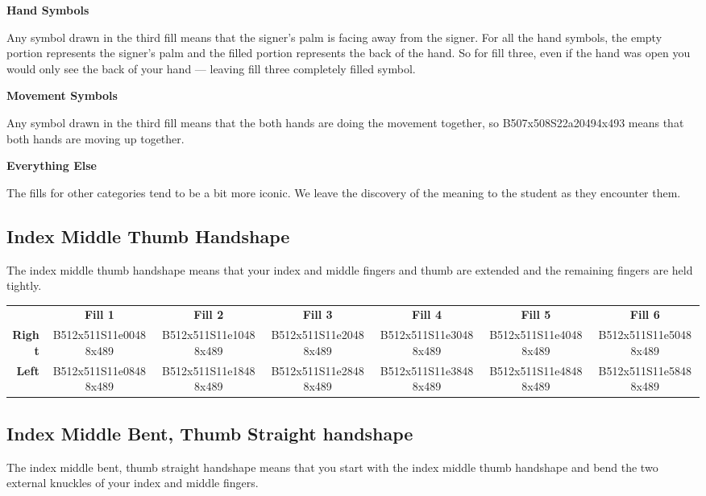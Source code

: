 \documentclass{article}
\begin{document}
\noindent
\textbf{Hand Symbols}

Any symbol drawn in the third fill means that the signer's palm is facing away from the signer.
For all the hand symbols, the empty portion represents the signer's palm and the filled portion represents the back of the hand.
So for fill three, even if the hand was open you would only see the back of your hand --- leaving fill three completely filled symbol.

\noindent
\textbf{Movement Symbols}

Any symbol drawn in the third fill means that the both hands are doing the movement together, so B507x508S22a20494x493 means that both hands are moving up together.

\noindent
\textbf{Everything Else}

The fills for other categories tend to be a bit more iconic.
We leave the discovery of the meaning to the student as they encounter them.

\subsection{Index Middle Thumb Handshape}

The index middle thumb handshape means that your index and middle fingers and thumb are extended and the remaining fingers are held tightly.

\begin{center}
\begin{tabular}{r*{6}{c}}
&\textbf{Fill 1}&\textbf{Fill 2}&\textbf{Fill 3}&\textbf{Fill 4}&\textbf{Fill 5}&\textbf{Fill 6}\\
\textbf{Right}&
B512x511S11e00488x489&
B512x511S11e10488x489&
B512x511S11e20488x489&
B512x511S11e30488x489&
B512x511S11e40488x489&
B512x511S11e50488x489\\
\textbf{Left}&
B512x511S11e08488x489&
B512x511S11e18488x489&
B512x511S11e28488x489&
B512x511S11e38488x489&
B512x511S11e48488x489&
B512x511S11e58488x489\\
\end{tabular}
\end{center}

\subsection{Index Middle Bent, Thumb Straight handshape}

The index middle bent, thumb straight handshape means that you start with the index middle thumb handshape and bend the two external knuckles of your index and middle fingers.
\end{document}
